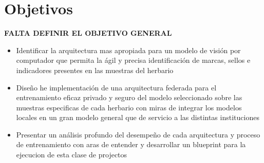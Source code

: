 \chapter{Objetivos}

\textbf{FALTA DEFINIR EL OBJETIVO GENERAL}

\begin{itemize}
    \item Identificar la arquitectura mas apropiada para un modelo de visión por computador que permita la ágil y precisa identificación de marcas, sellos e indicadores presentes en las muestras del herbario
    \item  Diseño he implementación de una arquitectura federada para el entrenamiento eficaz privado y seguro del modelo seleccionado sobre las muestras especificas de cada herbario con miras de integrar los modelos locales en un gran modelo general que de servicio a las distintas instituciones 
    \item Presentar un análisis profundo del desempeño de cada arquitectura y proceso de entrenamiento con aras de entender y desarrollar un blueprint para la ejecucion de esta clase de projectos
\end{itemize}